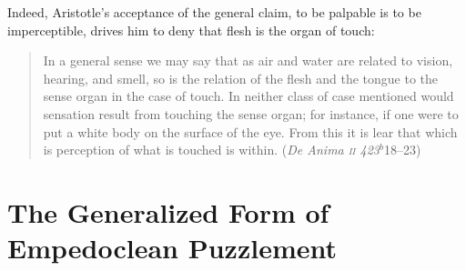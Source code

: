 Indeed, Aristotle's acceptance of the general claim, to be palpable is to be imperceptible, drives him to deny that flesh is the organ of touch:
\begin{quote}
    In a general sense we may say that as air and water are related to vision, hearing, and smell, so is the relation of the flesh and the tongue to the sense organ in the case of touch. In neither class of case mentioned would sensation result from touching the sense organ; for instance, if one were to put a white body on the surface of the eye. From this it is lear that which is perception of what is touched is within. (\emph{De Anima \textsc{ii} 423\( ^{b} \)}18--23)
\end{quote}


\section{The Generalized Form of Empedoclean Puzzlement} %
\label{sec:the_generalized_form_of_empedoclean_puzzlement}



